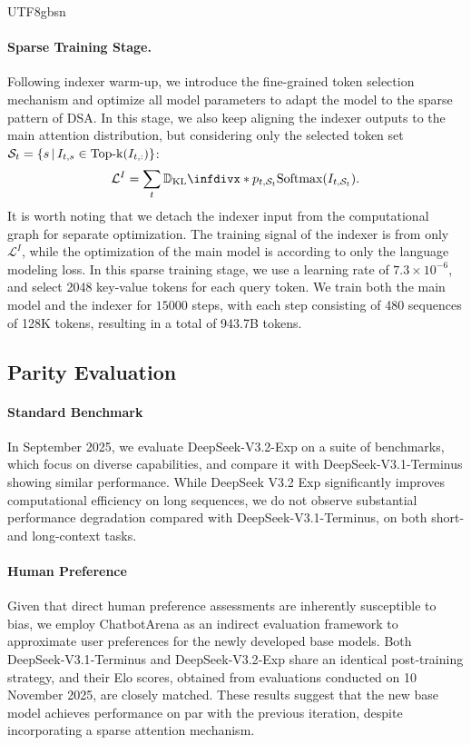 \documentclass[11pt, a4paper, logo, copyright, nonumbering]{deepseek}
\def\oldmodel{DeepSeek-V3.1-Terminus}
\def\method{DSA}
\newcommand{\Dkl}{\mathbb{D}_{\mathrm{KL}}\infdivx*}
\begin{document}
\begin{CJK*}{UTF8}{gbsn}
\paragraph{Sparse Training Stage.}
Following indexer warm-up, we introduce the fine-grained token selection mechanism and optimize all model parameters to adapt the model to the sparse pattern of \method{}. 
In this stage, we also keep aligning the indexer outputs to the main attention distribution, but considering only the selected token set $\mathcal{S}_t=\qty{s \, \middle| \, I_{t,s} \in \text{Top-k} \qty(I_{t,:})}$:
\begin{equation}
    \mathcal{L}^{I} = \sum_t \Dkl{p_{t,\mathcal{S}_t}}{\text{Softmax}\qty(I_{t,\mathcal{S}_t})}. 
\end{equation}
It is worth noting that we detach the indexer input from the computational graph for separate optimization. 
The training signal of the indexer is from only $\mathcal{L}^{I}$, while the optimization of the main model is according to only the language modeling loss.
In this sparse training stage, we use a learning rate of $7.3 \times 10^{-6}$, and select 2048 key-value tokens for each query token.
We train both the main model and the indexer for $15000$ steps, with each step consisting of 480 sequences of 128K tokens, resulting in a total of 943.7B tokens.

\subsection{Parity Evaluation}

\paragraph{Standard Benchmark}
In September 2025, we evaluate DeepSeek-V3.2-Exp on a suite of benchmarks, which focus on diverse capabilities, and compare it with \oldmodel{} showing similar performance. 
While DeepSeek V3.2 Exp significantly improves computational efficiency on long sequences, we do not observe substantial performance degradation compared with \oldmodel{}, on both short- and long-context tasks. 

\paragraph{Human Preference} Given that direct human preference assessments are inherently susceptible to bias, we employ ChatbotArena as an indirect evaluation framework to approximate user preferences for the newly developed base models. Both DeepSeek‑V3.1‑Terminus and DeepSeek‑V3.2‑Exp share an identical post‑training strategy, and their Elo scores, obtained from evaluations conducted on 10 November 2025, are closely matched. These results suggest that the new base model achieves performance on par with the previous iteration, despite incorporating a sparse attention mechanism.

\end{CJK*}
\end{document}
